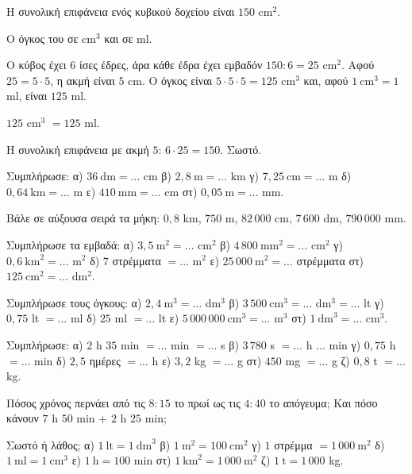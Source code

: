 \tixero Η συνολική επιφάνεια ενός κυβικού δοχείου είναι $150$ cm$^2$.\par
\tithelo Ο όγκος του σε cm$^3$ και σε ml.\par
\possindeo Ο κύβος έχει $6$ ίσες έδρες, άρα κάθε έδρα έχει εμβαδόν $150:6=25$ cm$^2$. Αφού $25=5\cdot5$, η ακμή είναι $5$ cm. Ο όγκος είναι $5\cdot5\cdot5=125$ cm$^3$ και, αφού $1\ \mathrm{cm}^3=1$ ml, είναι $125$ ml.\par
\apantisi $125$ cm$^3$ $=125$ ml.\par
\elegxos Η συνολική επιφάνεια με ακμή $5$: $6\cdot25=150$. Σωστό.



\ex Συμπλήρωσε: α) $36\ \mathrm{dm}=\ldots$ cm \quad β) $2{,}8\ \mathrm{m}=\ldots$ km \quad γ) $7{,}25\ \mathrm{cm}=\ldots$ m \quad δ) $0{,}64\ \mathrm{km}=\ldots$ m \quad ε) $410\ \mathrm{mm}=\ldots$ cm \quad στ) $0{,}05\ \mathrm{m}=\ldots$ mm.

\ex Βάλε σε αύξουσα σειρά τα μήκη: $0{,}8$ km, $750$ m, $82\,000$ cm, $7\,600$ dm, $790\,000$ mm.

\ex Συμπλήρωσε τα εμβαδά: α) $3{,}5\ \mathrm{m}^2=\ldots$ cm$^2$ \quad β) $4\,800\ \mathrm{mm}^2=\ldots$ cm$^2$ \quad γ) $0{,}6\ \mathrm{km}^2=\ldots$ m$^2$ \quad δ) $7$ στρέμματα $=\ldots$ m$^2$ \quad ε) $25\,000\ \mathrm{m}^2=\ldots$ στρέμματα \quad στ) $125\ \mathrm{cm}^2=\ldots$ dm$^2$.

\ex Συμπλήρωσε τους όγκους: α) $2{,}4\ \mathrm{m}^3=\ldots$ dm$^3$ \quad β) $3\,500\ \mathrm{cm}^3=\ldots$ dm$^3=\ldots$ lt \quad γ) $0{,}75$ lt $=\ldots$ ml \quad δ) $25$ ml $=\ldots$ lt \quad ε) $5\,000\,000\ \mathrm{cm}^3=\ldots$ m$^3$ \quad στ) $1\ \mathrm{dm}^3=\ldots$ cm$^3$.

\ex Συμπλήρωσε: α) $2$ h $35$ min $=\ldots$ min $=\ldots$ s \quad β) $3\,780$ s $=\ldots$ h $\ldots$ min \quad γ) $0{,}75$ h $=\ldots$ min \quad δ) $2{,}5$ ημέρες $=\ldots$ h \quad ε) $3{,}2$ kg $=\ldots$ g \quad στ) $450$ mg $=\ldots$ g \quad ζ) $0{,}8$ t $=\ldots$ kg.

\ex Πόσος χρόνος περνάει από τις $8{:}15$ το πρωί ως τις $4{:}40$ το απόγευμα; Και πόσο κάνουν $7$ h $50$ min $+$ $2$ h $25$ min;

\ex Σωστό ή λάθος; α) $1\ \mathrm{lt}=1\ \mathrm{dm}^3$ \quad β) $1\ \mathrm{m}^2=100\ \mathrm{cm}^2$ \quad γ) $1$ στρέμμα $=1\,000\ \mathrm{m}^2$ \quad δ) $1\ \mathrm{ml}=1\ \mathrm{cm}^3$ \quad ε) $1\ \mathrm{h}=100$ min \quad στ) $1\ \mathrm{km}^2=1\,000\ \mathrm{m}^2$ \quad ζ) $1\ \mathrm{t}=1\,000$ kg.

